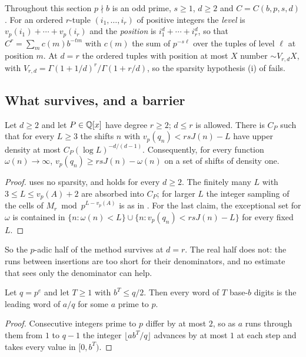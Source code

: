 \documentclass[11pt]{article}
\begin{document}
Throughout this section $p\nmid b$ is an odd prime, $s\ge1$, $d\ge2$ and $C=C(b,p,s,d)$. For an ordered
$r$-tuple $(i_1,\ldots,i_r)$ of positive integers the \emph{level} is $v_p(i_1)+\cdots+v_p(i_r)$ and the
\emph{position} is $i_1^d+\cdots+i_r^d$, so that $C^r=\sum_mc(m)b^{-tm}$ with $c(m)$ the sum of $p^{-s\ell}$ over the
tuples of level $\ell$ at position $m$. At $d=r$ the ordered tuples with position at most $X$ number
$\sim V_{r,d}X$, with $V_{r,d}=\Gamma(1+1/d)^r/\Gamma(1+r/d)$, so the sparsity hypothesis (i) of
 fails.

\subsection{What survives, and a barrier}

\begin{proposition}\label{prop:depthtight}
Let $d\ge2$ and let $P\in\mathbb Q[x]$ have degree $r\ge2$; $d\le r$ is allowed. There is $C_P$ such that for every
$L\ge3$ the shifts $n$ with $v_p(q_n)<rsJ(n)-L$ have upper density at most $C_P(\log L)^{-d/(d-1)}$.
Consequently, for every function $\omega(n)\to\infty$, $v_p(q_n)\ge rsJ(n)-\omega(n)$ on a set of shifts of
density one.
\end{proposition}

\begin{proof}
 uses no sparsity, and  holds for every $d\ge2$. The finitely many
$L$ with $3\le L\le v_p(A)+2$ are absorbed into $C_P$; for larger $L$ the integer sampling of the cells of
$M_r\bmod p^{L-v_p(A)}$ is as in . For the last claim, the exceptional
set for $\omega$ is contained in $\{n:\omega(n)<L\}\cup\{n:v_p(q_n)<rsJ(n)-L\}$ for every fixed $L$.
\end{proof}

So the $p$-adic half of the method survives at $d=r$. The real half does not: the runs between insertions
are too short for their denominators, and no estimate that sees only the denominator can help.

\begin{lemma}\label{lem:barrier}
Let $q=p^e$ and let $T\ge1$ with $b^T\le q/2$. Then every word of $T$ base-$b$ digits is the leading word of
$a/q$ for some $a$ prime to $p$.
\end{lemma}

\begin{proof}
Consecutive integers prime to $p$ differ by at most $2$, so as $a$ runs through them from $1$ to $q-1$ the
integer $\lfloor ab^T/q\rfloor$ advances by at most $1$ at each step and takes every value in $[0,b^T)$.
\end{proof}
\end{document}
